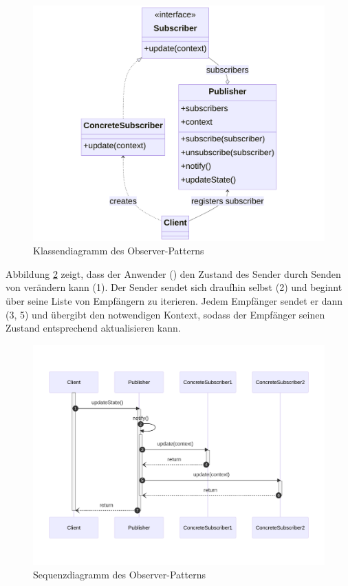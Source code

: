 \begin{figure}[H]
	\centering
	\includegraphics[width=0.95\linewidth]{images/patterns/observer-class.png}
	\caption{Klassendiagramm des Observer-Patterns \cite{skobeleva_observer_2023}}
	\label{fig:observer-class}
\end{figure}

Abbildung \ref{fig:observer-seq} zeigt, dass der Anwender () den Zustand des Sender durch Senden von  verändern kann (1). Der Sender sendet sich draufhin selbst  (2) und beginnt über seine Liste von Empfängern zu iterieren. Jedem Empfänger sendet er dann  (3, 5) und übergibt den notwendigen Kontext, sodass der Empfänger seinen Zustand entsprechend aktualisieren kann.

\begin{figure}[H]
	\centering
	\includegraphics[width=0.95\linewidth]{images/patterns/observer-seq.png}
	\caption{Sequenzdiagramm des Observer-Patterns \cite{skobeleva_observer_2023}}
	\label{fig:observer-seq}
\end{figure}

